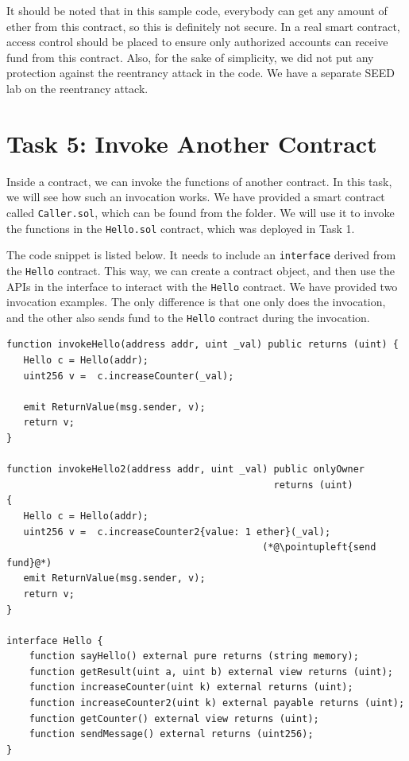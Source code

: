 It should be noted that in this sample code, everybody can get
any amount of ether from this contract, so this is definitely 
not secure. In a real smart contract, access control should be 
placed to ensure only authorized accounts can receive fund 
from this contract. Also, for the sake of simplicity, 
we did not put any protection against the reentrancy attack 
in the code. 
We have a separate SEED lab on the reentrancy attack. 


\section{Task 5: Invoke Another Contract} 

Inside a contract, we can invoke the functions of another contract. 
In this task, we will see how such an invocation works. 
We have provided a smart contract called \texttt{Caller.sol}, 
which can be found from the \contractfolder folder. 
We will use it to invoke the functions in the \texttt{Hello.sol} 
contract, which was deployed in Task 1. 

The code snippet is listed below. It needs to include an 
\texttt{interface} derived from the \texttt{Hello} contract.
This way, we can create a contract object, and then use
the APIs in the interface to interact with the 
\texttt{Hello} contract. We have provided two 
invocation examples. The only difference is that 
one only does the invocation, and the other 
also sends fund to the \texttt{Hello} contract
during the invocation. 


\begin{lstlisting}
function invokeHello(address addr, uint _val) public returns (uint) {
   Hello c = Hello(addr);
   uint256 v =  c.increaseCounter(_val);

   emit ReturnValue(msg.sender, v);
   return v;
}

function invokeHello2(address addr, uint _val) public onlyOwner 
                                               returns (uint) 
{
   Hello c = Hello(addr);
   uint256 v =  c.increaseCounter2{value: 1 ether}(_val);
                                             (*@\pointupleft{send fund}@*) 
   emit ReturnValue(msg.sender, v);
   return v;
}

interface Hello {
    function sayHello() external pure returns (string memory);
    function getResult(uint a, uint b) external view returns (uint);
    function increaseCounter(uint k) external returns (uint);
    function increaseCounter2(uint k) external payable returns (uint); 
    function getCounter() external view returns (uint);
    function sendMessage() external returns (uint256);
}
\end{lstlisting}
 

